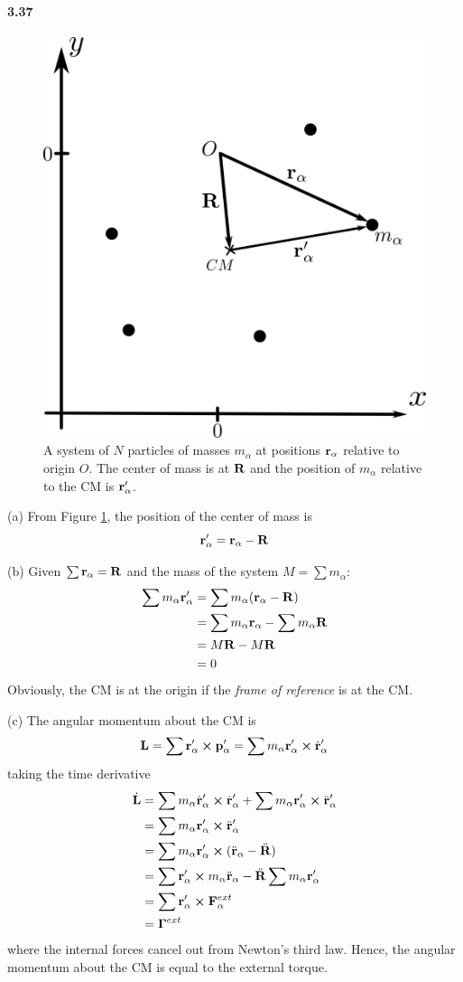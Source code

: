 \documentclass[../problems.tex]{subfiles}
\begin{document}
\paragraph{3.37}
\begin{figure}[ht]
    \centering
    \includegraphics[width=0.3\linewidth]{../images/fig3_37.png}
    \captionsetup{width=0.7\linewidth}
    \caption{A system of $N$ particles of masses $m_{\alpha}$ at positions $\vb{r}_{\alpha}$ 
    relative to origin $O$. The center of mass is at $\vb{R}$ and the position of $m_{\alpha}$
    relative to the CM is $\vb{r}_{\alpha}'$.}
    \label{fig:3_37}
\end{figure}
(a) From Figure \ref{fig:3_37}, the position of the center of mass is
\begin{equation*}
    \vb{r}_{\alpha}' = \vb{r}_{\alpha} - \vb{R}
\end{equation*}

(b) Given $\sum \vb{r}_{\alpha} = \vb{R}$ and the mass of the system $M = \sum m_{\alpha}$:
\begin{align*}
    \sum m_{\alpha} \vb{r}_{\alpha}' &= \sum m_{\alpha} (\vb{r}_{\alpha} - \vb{R}) \\
    &= \sum m_{\alpha} \vb{r}_{\alpha} - \sum m_{\alpha} \vb{R} \\
    &= M \vb{R} - M \vb{R} \\
    &= 0
\end{align*}
Obviously, the CM is at the origin if the \textit{frame of reference} is at the CM.

(c) The angular momentum about the CM is
\begin{align*}
    \vb{L} = \sum \vb{r}_{\alpha}' \cp \vb{p}_{\alpha}'
    = \sum m_{\alpha} \vb{r}_{\alpha}' \cp \dot{\vb{r}}_{\alpha}'
\end{align*}
taking the time derivative
\begin{align*}
    \dot{\vb{L}} &= \sum m_{\alpha} \dot{\vb{r}}_{\alpha}' \cp \dot{\vb{r}}_{\alpha}'
        + \sum m_{\alpha} \vb{r}_{\alpha}' \cp \ddot{\vb{r}}_{\alpha}' \\
    &= \sum m_{\alpha} \vb{r}_{\alpha}' \cp \ddot{\vb{r}}_{\alpha}' \\
    &= \sum m_{\alpha} \vb{r}_{\alpha}' \cp (\ddot{\vb{r}}_{\alpha} - \ddot{\vb{R}}) \\
    &= \sum  \vb{r}_{\alpha}' \cp m_{\alpha} \ddot{\vb{r}}_{\alpha} 
        - \ddot{\vb{R}} \sum m_{\alpha} \vb{r}_{\alpha}' \\
    &= \sum \vb{r}_{\alpha}' \cp \vb{F}_{\alpha}^{ext} \\
    &= \vb{\Gamma}^{ext}
\end{align*}
where the internal forces cancel out from Newton's third law. Hence, the angular momentum about
the CM is equal to the external torque.
\end{document}
